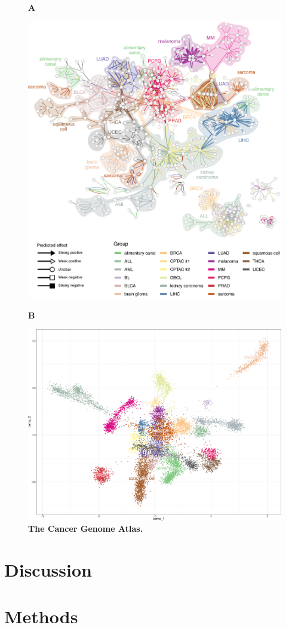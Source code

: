 \begin{figure}[htb!]
	{\raggedright\textbf{A}}
	\begin{center}\includegraphics[width=.85\linewidth]{fig/tcga/grouped_interactions.pdf}\end{center}
	{\raggedright\textbf{B}}
	\begin{center}\includegraphics[width=.6\linewidth]{fig/tcga/plot_fr_cropped.png}\end{center}
	\caption{
		\textbf{The Cancer Genome Atlas.}
	}
	\label{fig:tcga}
\end{figure}


\section{Discussion}

\section{Methods}

